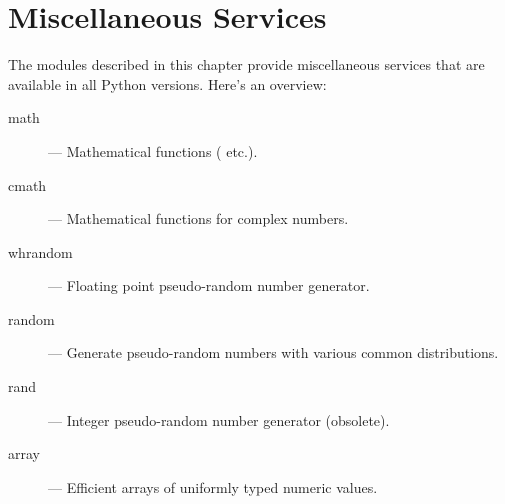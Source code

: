 \chapter{Miscellaneous Services}
\label{misc}

The modules described in this chapter provide miscellaneous services
that are available in all Python versions.  Here's an overview:

\begin{description}

\item[math]
--- Mathematical functions ( etc.).

\item[cmath]
--- Mathematical functions for complex numbers.

\item[whrandom]
--- Floating point pseudo-random number generator.

\item[random]
--- Generate pseudo-random numbers with various common distributions.

\item[rand]
--- Integer pseudo-random number generator (obsolete).

\item[array]
--- Efficient arrays of uniformly typed numeric values.

\end{description}
